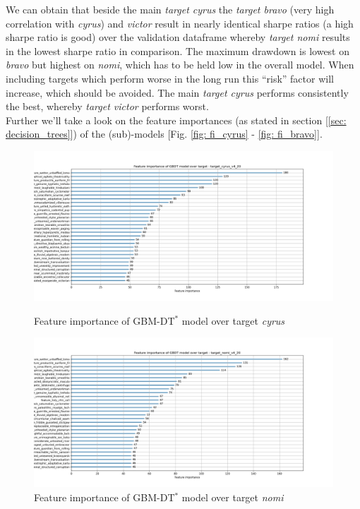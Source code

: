 \documentclass[12pt, a4paper]{article}
\begin{document}
\newpage
We can obtain that beside the main \textit{target cyrus} the \textit{target bravo} (very high correlation with \textit{cyrus}) and \textit{victor} result in nearly identical sharpe ratios (a high sharpe ratio is good) over the validation dataframe whereby \textit{target nomi} results in the lowest sharpe ratio in comparison. The maximum drawdown is lowest on \textit{bravo} but highest on \textit{nomi}, which has to be held low in the overall model.
When including targets which perform worse in the long run this ``risk'' factor will increase, which should be avoided.
The main \textit{target cyrus} performs consistently the best, whereby \textit{target victor} performs worst. \\
Further we'll take a look on the feature importances (as stated in section [\ref{sec: decision_trees}]) of the (sub)-models [Fig. \ref{fig: fi_cyrus} - \ref{fig: fi_bravo}].
\begin{figure}[htbp]
\begin{minipage}[t]{8cm}
\vspace{0pt}
\centering
\includegraphics[width=1\textwidth,trim={0 0 0 0},clip]{rounds/2024-01-17_round1_feature_importance_target_cyrus_v4_20.png}
\caption[Feature importance of GBDT model over target cyrus]{Feature importance of GBM-DT$^{\ast}$ model over target \textit{cyrus}}
\label{fig: fi_cyrus}
\end{minipage}
\hfill
\begin{minipage}[t]{8cm}
\vspace{0pt}
\centering
\includegraphics[width=1\textwidth,trim={0 0 0 0},clip]{rounds/2024-01-17_round1_feature_importance_target_nomi_v4_20.png}
\caption[Feature importance of model nomi]{Feature importance of GBM-DT$^{\ast}$ model over target \textit{nomi}}
\label{fig: fi_nomi}
\end{minipage}
\end{figure}
\end{document}
